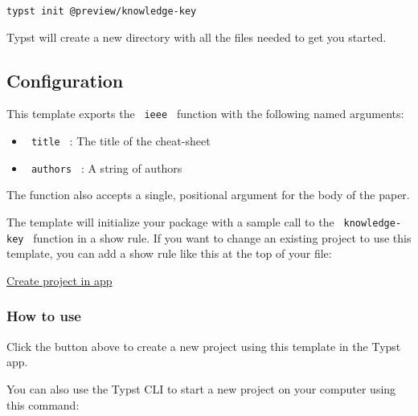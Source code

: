 \begin{verbatim}
typst init @preview/knowledge-key
\end{verbatim}

Typst will create a new directory with all the files needed to get you
started.

\subsection{Configuration}\label{configuration}

This template exports the \texttt{\ ieee\ } function with the following
named arguments:

\begin{itemize}
\tightlist
\item
  \texttt{\ title\ } : The title of the cheat-sheet
\item
  \texttt{\ authors\ } : A string of authors
\end{itemize}

The function also accepts a single, positional argument for the body of
the paper.

The template will initialize your package with a sample call to the
\texttt{\ knowledge-key\ } function in a show rule. If you want to
change an existing project to use this template, you can add a show rule
like this at the top of your file:

\begin{Shaded}
\begin{Highlighting}[]

\NormalTok{)}

\end{Highlighting}
\end{Shaded}

\href{/app?template=knowledge-key&version=1.0.1}{Create project in app}

\subsubsection{How to use}\label{how-to-use}

Click the button above to create a new project using this template in
the Typst app.

You can also use the Typst CLI to start a new project on your computer
using this command:


